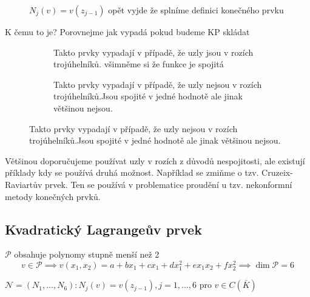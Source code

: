 \documentclass[../main.tex]{subfiles}
\begin{document}
\begin{remark}

    \begin{figure}[ht]
        \centering
        \caption{$N_j(v) = v(z_{j-1})$ opět vyjde že splníme definici konečného prvku}
    \end{figure}
    
    K čemu to je? Porovnejme jak vypadá pokud budeme KP skládat

    \begin{figure}[h]
        \centering
        \begin{subfigure}[t]{0.5\textwidth}
            \centering
            \caption{Takto prvky vypadají v případě, že uzly jsou v rozích trojúhelníků. \break všimněme si že funkce je spojitá}
        \end{subfigure}
        \hfill
        \begin{subfigure}[t]{0.5\textwidth}
            \centering
            \caption{Takto prvky vypadají v případě, že uzly nejsou v rozích trojúhelníků.\break Jsou spojité v jedné hodnotě ale jinak většinou nejsou.}
        \end{subfigure}
    \end{figure}

    Většinou doporučujeme používat uzly v rozích z důvodů nespojitosti, ale existují příklady kdy se používá druhá možnost. Například se zmiňme o tzv. Cruzeix-Raviartův prvek. Ten se používá v problematice proudění u tzv. nekonformní metody konečných prvků.


\end{remark}

\subsection{Kvadratický Lagrangeův prvek}


$\mathcal{P}$ obsahuje polynomy stupně menší než 2
\begin{equation}
    v\in\mathcal{P}\implies v(x_1,x_2) = a + bx_1 + cx_1 + dx_1^2 + ex_1x_2 + fx_2^2 \implies \dim\mathcal{P} = 6
\end{equation}

$\mathcal{N} = (N_1,...,N_6): N_j(v) = v(z_{j-1}), j=1,...,6$ pro $v\in C(\bar{K})$
\end{document}
